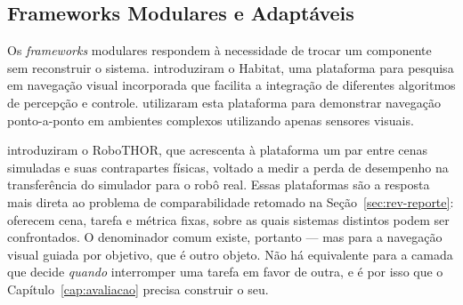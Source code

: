\subsection{Frameworks Modulares e Adaptáveis}
\label{sec:rev-modulares}

Os \textit{frameworks} modulares respondem à necessidade de trocar um componente sem reconstruir o sistema.  introduziram o Habitat, uma plataforma para pesquisa em navegação visual incorporada que facilita a integração de diferentes algoritmos de percepção e controle.  utilizaram esta plataforma para demonstrar navegação ponto-a-ponto em ambientes complexos utilizando apenas sensores visuais.

 introduziram o RoboTHOR, que acrescenta à plataforma
um par entre cenas simuladas e suas contrapartes físicas, voltado a medir a perda de
desempenho na transferência do simulador para o robô real.
Essas plataformas são a resposta mais direta ao problema de comparabilidade retomado na
Seção~\ref{sec:rev-reporte}: oferecem cena, tarefa e métrica fixas, sobre as quais
sistemas distintos podem ser confrontados. O denominador comum existe, portanto --- mas
para a navegação visual guiada por objetivo, que é outro objeto. Não há equivalente para
a camada que decide \emph{quando} interromper uma tarefa em favor de outra, e é por isso
que o Capítulo~\ref{cap:avaliacao} precisa construir o seu.

